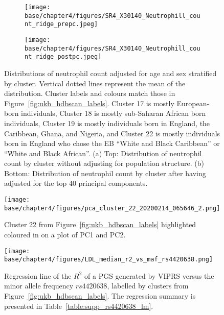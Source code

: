 \clearpage

\begin{figure}[ht]
  \centering
  \begin{subfigure}[b]{0.7\linewidth}
    \texttt{[image: base/chapter4/figures/SR4\_X30140\_Neutrophill\_count\_ridge\_prepc.jpeg]}
    \caption{}
    \label{fig:supp_pheno_ridge_neut_pre}
  \end{subfigure}
    \begin{subfigure}[b]{0.7\linewidth}
    \texttt{[image: base/chapter4/figures/SR4\_X30140\_Neutrophill\_count\_ridge\_postpc.jpeg]}
    \caption{}
    \label{fig:supp_pheno_ridge_neut_post}
  \end{subfigure}
  \caption[Distributions of neutrophil count by cluster]{Distributions of neutrophil count adjusted for age and sex stratified by cluster. Vertical dotted lines represent the mean of the distribution. Cluster labels and colours match those in Figure~\ref{fig:ukb_hdbscan_labels}. Cluster 17 is mostly European-born individuals, Cluster 18 is mostly sub-Saharan African born individuals, Cluster 19 is mostly individuals born in England, the Caribbean, Ghana, and Nigeria, and Cluster 22 is mostly individuals born in England who chose the EB ``White and Black Caribbean'' or ``White and Black African''. (a) Top: Distribution of neutrophil count by cluster without adjusting for population structure. (b) Bottom: Distribution of neutrophil count by cluster after having adjusted for the top $40$ principal components.}
  \label{fig:supp_pheno_ridge_neut}
\end{figure}

\clearpage

\begin{figure}[ht]
  \centering
    \texttt{[image: base/chapter4/figures/pca\_cluster\_22\_20200214\_065646\_2.png]}
  \caption{Cluster 22 from Figure~\ref{fig:ukb_hdbscan_labels} highlighted coloured in on a plot of PC1 and PC2.}
  \label{fig:supp_cluster_22_pca}
\end{figure}

\clearpage

\begin{figure}[!ht]
  \centering
    \texttt{[image: base/chapter4/figures/LDL\_median\_r2\_vs\_maf\_rs4420638.png]}
  \caption[Regression line of PGS vs MAF of rs4420638]{Regression line of the $R^2$ of a PGS generated by VIPRS versus the minor allele frequency $rs4420638$, labelled by clusters from Figure~\ref{fig:ukb_hdbscan_labels}. The regression summary is presented in Table~\ref{table:supp_rs4420638_lm}.}
  \label{fig:supp_rs4420638_lm}
\end{figure}

